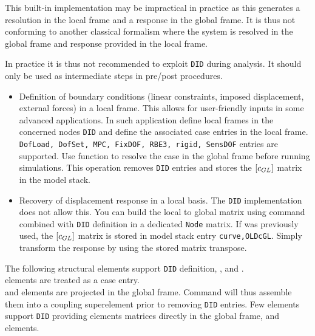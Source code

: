 \begin{SDT}
This built-in implementation may be impractical in practice as this generates a resolution in the local frame and a response in the global frame. It is thus not conforming to another classical formalism where the system is resolved in the global frame and response provided in the local frame.

In practice it is thus not recommended to exploit {\tt DID} during analysis. It should only be used as intermediate steps in pre/post procedures.
\begin{itemize}
\item Definition of boundary conditions (linear constraints, imposed displacement, external forces) in a local frame. This allows for user-friendly inputs in some advanced applications. In such application define local frames in the concerned nodes {\tt DID} and define the associated case entries in the local frame. {\tt DofLoad, DofSet, MPC, FixDOF, RBE3, rigid, SensDOF} entries are supported. Use function  to resolve the case in the global frame before running simulations. This operation removes {\tt DID} entries and stores the $\left[c_{GL}\right]$ matrix in the model stack.
\item Recovery of displacement response in a local basis. The {\tt DID} implementation does not allow this. You can build the local to global matrix using  command combined with {\tt DID} definition in a dedicated {\tt Node} matrix. If  was previously used, the $\left[c_{GL}\right]$ matrix is stored in model stack entry {\tt curve,OLDcGL}. Simply transform the response by using the stored matrix transpose.
\end{itemize}

The following structural elements support {\tt DID} definition, \rigid, \celas and \massb.\\
\rigid elements are treated as a case entry.\\
\celas and \massb elements are projected in the global frame. Command  will thus assemble them into a coupling superelement prior to removing {\tt DID} entries.
Few elements support {\tt DID} providing elements matrices directly in the global frame, \celas and \massb elements.

\end{SDT}


